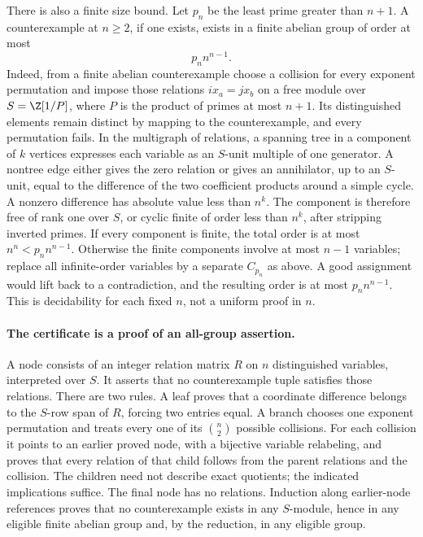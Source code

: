 There is also a finite size bound. Let \(p_n\) be the least prime
greater than \(n+1\). A counterexample at \(n\ge2\), if one exists,
exists in a finite abelian group of order at most
\[
 p_n n^{n-1}.
\]
Indeed, from a finite abelian counterexample choose a collision
for every exponent permutation and impose those relations
\(ix_a=jx_b\) on a free module over
\(S=\Z[1/P]\), where \(P\) is the product of primes at most \(n+1\).
Its distinguished elements remain distinct by mapping to the
counterexample, and every permutation fails. In the multigraph
of relations, a spanning tree in a component of \(k\) vertices
expresses each variable as an \(S\)-unit multiple of one generator.
A nontree edge either gives the zero relation or gives an
annihilator, up to an \(S\)-unit, equal to the difference of the
two coefficient products around a simple cycle. A nonzero difference
has absolute value less than \(n^k\).
The component is therefore free of rank one over \(S\), or cyclic
finite of order less than \(n^k\), after stripping inverted primes.
If every component is finite, the total order is at most \(n^n<
p_nn^{n-1}\). Otherwise the finite components involve at most
\(n-1\) variables; replace all infinite-order variables by a separate
\(C_{p_n}\) as above. A good assignment would lift back to a
contradiction, and the resulting order is at most \(p_nn^{n-1}\).
This is decidability for each fixed \(n\), not a uniform proof in \(n\).

\paragraph{The certificate is a proof of an all-group assertion.}
A node consists of an integer relation matrix \(R\) on \(n\)
distinguished variables, interpreted over \(S\). It asserts that
no counterexample tuple satisfies those relations. There are two
rules. A leaf proves that a coordinate difference belongs to the
\(S\)-row span of \(R\), forcing two entries equal. A branch chooses
one exponent permutation and treats every one of its
\(\binom n2\) possible collisions. For each collision it points
to an earlier proved node, with a bijective variable relabeling,
and proves that every relation of that child follows from the
parent relations and the collision. The children need not describe
exact quotients; the indicated implications suffice.
The final node has no relations. Induction along earlier-node
references proves that no counterexample exists in any \(S\)-module,
hence in any eligible finite abelian group and, by the reduction,
in any eligible group.

